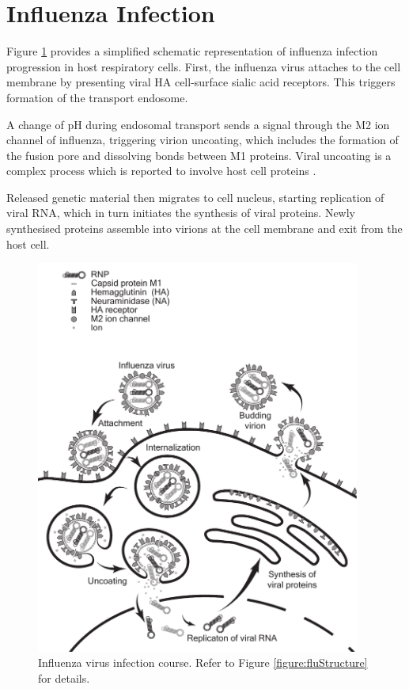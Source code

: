 \section{Influenza Infection}

Figure \ref{figure:fluInfectionStages} provides a simplified schematic representation of influenza infection progression in host respiratory cells. First, the influenza virus attaches to the cell membrane by presenting viral HA cell-surface sialic acid receptors. This triggers formation of the transport endosome.

A change of pH during endosomal transport sends a signal through the M2 ion channel of influenza, triggering virion uncoating, which includes the formation of the fusion pore and dissolving bonds between M1 proteins. Viral uncoating is a complex process which is reported to involve host cell proteins \cite{banerjee2014influenza}.

Released genetic material then migrates to cell nucleus, starting replication of viral RNA, which in turn initiates the synthesis of viral proteins. Newly synthesised proteins assemble into virions at the cell membrane and exit from the host cell.

\begin{figure}
\begin{center}
\includegraphics[width=0.95\textwidth, trim={0cm 0cm 0cm 0cm}, clip]{D_chapters/0_introduction/flu_stages.pdf}
\caption[Influenza virus infection course]{Influenza virus infection course. Refer to Figure \ref{figure:fluStructure} for details.}
\label{figure:fluInfectionStages}
\end{center}
\end{figure}